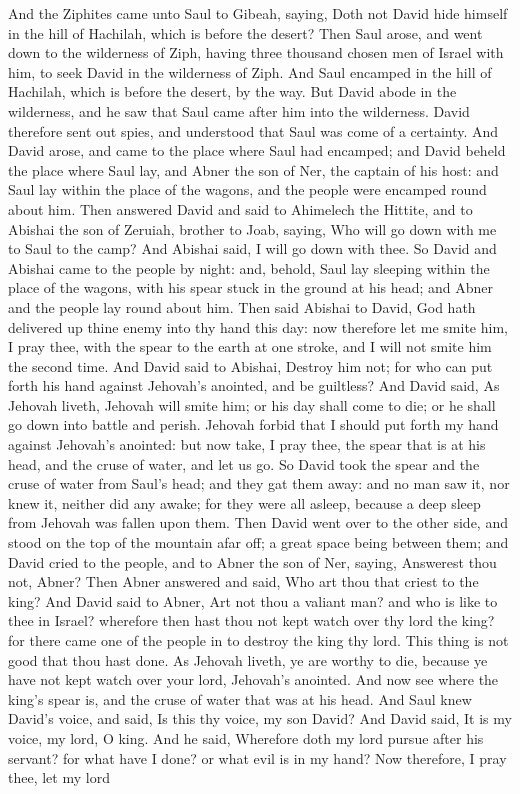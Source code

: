 And the Ziphites came unto Saul to Gibeah, saying, Doth not David hide himself in the hill of Hachilah, which is before the desert? Then Saul arose, and went down to the wilderness of Ziph, having three thousand chosen men of Israel with him, to seek David in the wilderness of Ziph. And Saul encamped in the hill of Hachilah, which is before the desert, by the way. But David abode in the wilderness, and he saw that Saul came after him into the wilderness. David therefore sent out spies, and understood that Saul was come of a certainty. And David arose, and came to the place where Saul had encamped; and David beheld the place where Saul lay, and Abner the son of Ner, the captain of his host: and Saul lay within the place of the wagons, and the people were encamped round about him.  Then answered David and said to Ahimelech the Hittite, and to Abishai the son of Zeruiah, brother to Joab, saying, Who will go down with me to Saul to the camp? And Abishai said, I will go down with thee. So David and Abishai came to the people by night: and, behold, Saul lay sleeping within the place of the wagons, with his spear stuck in the ground at his head; and Abner and the people lay round about him. Then said Abishai to David, God hath delivered up thine enemy into thy hand this day: now therefore let me smite him, I pray thee, with the spear to the earth at one stroke, and I will not smite him the second time. And David said to Abishai, Destroy him not; for who can put forth his hand against Jehovah’s anointed, and be guiltless? And David said, As Jehovah liveth, Jehovah will smite him; or his day shall come to die; or he shall go down into battle and perish. Jehovah forbid that I should put forth my hand against Jehovah’s anointed: but now take, I pray thee, the spear that is at his head, and the cruse of water, and let us go. So David took the spear and the cruse of water from Saul’s head; and they gat them away: and no man saw it, nor knew it, neither did any awake; for they were all asleep, because a deep sleep from Jehovah was fallen upon them.  Then David went over to the other side, and stood on the top of the mountain afar off; a great space being between them; and David cried to the people, and to Abner the son of Ner, saying, Answerest thou not, Abner? Then Abner answered and said, Who art thou that criest to the king? And David said to Abner, Art not thou a valiant man? and who is like to thee in Israel? wherefore then hast thou not kept watch over thy lord the king? for there came one of the people in to destroy the king thy lord. This thing is not good that thou hast done. As Jehovah liveth, ye are worthy to die, because ye have not kept watch over your lord, Jehovah’s anointed. And now see where the king’s spear is, and the cruse of water that was at his head.  And Saul knew David’s voice, and said, Is this thy voice, my son David? And David said, It is my voice, my lord, O king. And he said, Wherefore doth my lord pursue after his servant? for what have I done? or what evil is in my hand? Now therefore, I pray thee, let my lord 
